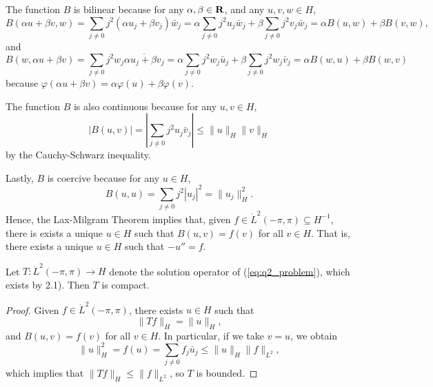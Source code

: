 \documentclass{homework}
\begin{document}
\begin{arabicparts}
		The function $B$ is bilinear because for any $\alpha,\beta \in \textnormal{\bf R}$, and any $u,v,w\in H$,
		\begin{equation}
			B(\alpha u + \beta v, w) = \sum_{j\ne0}j^2(\alpha u_j + \beta v_j)\bar{w}_j = \alpha\sum_{j\ne0}j^2u_j\bar{w}_j + \beta\sum_{j\ne0}j^2v_j\bar{w}_j = \alpha B(u,w) + \beta B(v,w),
		\end{equation}
		and
		\begin{equation}
			B(w, \alpha u + \beta v) =\sum_{j\ne0}j^2w_j\overline{\alpha u_j + \beta v_j} = \alpha\sum_{j\ne 0}j^2w_j\bar{u}_j + \beta \sum_{j\ne0}j^2w_j\bar{v}_j = \alpha B(w,u) + \beta B(w,v)
		\end{equation}
		because $\varphi(\alpha u + \beta v) = \alpha\varphi(u) + \beta\varphi(v)$.
		
		The function $B$ is also continuous because for any $u,v \in H$,
		\begin{equation}
			|B(u,v)| = \left|\sum_{j\ne0}j^2u_j\bar{v}_j\right| \le \lVert u\rVert_H \lVert v\rVert_H
		\end{equation}
		by the Cauchy-Schwarz inequality.
		
		Lastly, $B$ is coercive because for any $u \in H$,
		\begin{equation}
			B(u,u) = \sum_{j\ne0}j^2|u_j|^2 = \lVert u_j\rVert_H^2.
		\end{equation}
		Hence, the Lax-Milgram Theorem implies that, given $f \in \dot{L}^2(-\pi,\pi) \subseteq H^{-1}$, there is exists a unique $u \in H$ such that $B(u,v) = f(v)$ for all $v \in H$. That is, there exists a unique $u \in H$ such that $-u'' = f$.
		
		\questionpart Let $T : \dot{L}^2(-\pi, \pi) \to H$ denote the solution operator of (\ref{eq:q2_problem}), which exists by 2.1). Then $T$ is compact.
		
		\begin{proof}
			Given $f \in \dot{L}^2(-\pi,\pi)$, there exists $u \in H$ such that
			\begin{equation}
				\lVert Tf \rVert_H = \lVert u \rVert_H,
			\end{equation}
			and $B(u,v) = f(v)$ for all $v \in H$. In particular, if we take $v = u$, we obtain
			\begin{equation}
				\lVert u \rVert_H^2 = f(u) = \sum_{j\ne 0}f_j\bar{u}_j \le \lVert u \rVert_H \lVert f\rVert_{L^2},
			\end{equation} 
			which implies that $\lVert Tf\rVert_H \le \lVert f\rVert_{L^2}$, so $T$ is bounded.
			

\end{proof}
\end{arabicparts}
\end{document}
